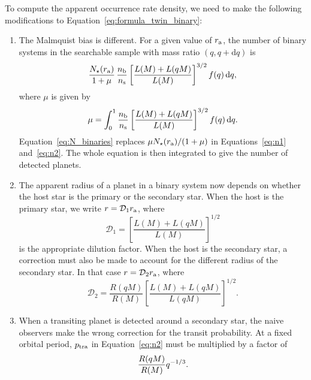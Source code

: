 \documentclass[12pt,modern,trackchanges]{aastex61}
\renewcommand{\a}{_{\rm a}}
\begin{document}
To compute the apparent occurrence rate density, we need to make
the following modifications to Equation~\ref{eq:formula_twin_binary}:
%
\begin{enumerate}
%
\item The Malmquist bias is different.  For a given value of $r\a$, the
  number of binary systems in the searchable sample with mass ratio
  $(q, q+\mathrm{d}q)$ is
\begin{equation}
    {N_\star(r\a)\over{1+\mu}}\, {n_{\rm b}\over n_{\rm s}}
    \left[{L(M) + L(qM) \over L(M)}\right]^{3/2}
    f(q)\,\mathrm{d}q,
    \label{eq:N_binaries}
\end{equation}
where $\mu$ is given by
\begin{equation}
    \mu= 
    \int_0^1 {n_{\rm b}\over n_{\rm s}}\left[{L(M) + L(qM)
    \over L(M)}\right]^{3/2} f(q)\,\mathrm{d}q.
    \label{eq:mu_general}
\end{equation}
Equation~\ref{eq:N_binaries} replaces ${\mu N_\star(r\a)/(1+\mu)}$
in Equations~\ref{eq:n1} and~\ref{eq:n2}.
The whole equation is then integrated to give the number of
detected planets.

\item The apparent radius of a planet in a binary system now depends
on whether the host star is the primary or the secondary star. When the host
is the primary star, we write $r=\mathcal{D}_1 r\a$, where
\begin{equation}
    \mathcal{D}_1
    = \left[ \frac{ L(M) + L(qM) }{ L(M) } \right]^{1/2}
    \label{eq:dil_1}
\end{equation}
is the appropriate dilution factor.
When the host is the secondary star, a correction must also be made
to account for the different radius of the secondary star.
In that case $r=\mathcal{D}_2 r\a$, where
\begin{equation}
  \mathcal{D}_2
  = \frac{R(qM)}{R(M)}
    \left[ \frac{L(M) + L(qM)}{L(qM)} \right]^{1/2}.
  \label{eq:dil_2}
\end{equation}

\item When a transiting planet is detected around a secondary star,
  the naive observers make the wrong correction for the transit
  probability.  At a fixed orbital period, $p_{\rm tra}$
  in Equation~\ref{eq:n2} must be multiplied by a factor of
\begin{equation}
  {R(qM) \over R(M)}q^{-1/3}.
\end{equation}

\end{enumerate}
\end{document}
